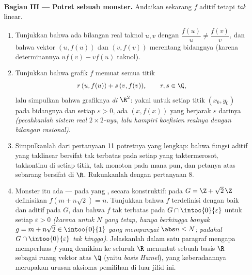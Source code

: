 \begin{problem}[{Soal akhir pekan --- $f(x + y) = f(x) + f(y)$:
keteraturan memaksa kelinearan, beserta potret monsternya}]
\medskip
\noindent\textbf{Bagian III --- Potret sebuah monster.} Andaikan
sekarang $f$ aditif tetapi \emph{tak} linear.
\begin{enumerate}[resume]
  \item Tunjukkan bahwa ada bilangan real taknol $u, v$ dengan
        $\dfrac{f(u)}{u} \neq \dfrac{f(v)}{v}$, dan bahwa
        vektor $(u, f(u))$ dan $(v, f(v))$ merentang bidangnya (karena
        determinannya $u f(v) - v f(u)$ taknol).
  \item Tunjukkan bahwa grafik $f$ memuat semua titik
        \[
        r\,(u, f(u)) + s\,(v, f(v)), \qquad r, s \in \Q ,
        \]
        lalu simpulkan bahwa grafiknya \emph{ di $\R^2$}: yakni untuk
        setiap titik $(x_0, y_0)$ pada bidangnya dan setiap
        $\varepsilon > 0$, ada $(x, f(x))$ yang berjarak
        $\varepsilon$ darinya \emph{(pecahkanlah sistem real $2\times2$-nya,
        lalu hampiri koefisien realnya dengan
        bilangan rasional)}.
  \item Simpulkanlah dari pertanyaan 11 potretnya yang lengkap: bahwa fungsi
        aditif yang taklinear bersifat tak terbatas pada setiap 
        yang taktermerosot, takkontinu di setiap titik, tak monoton pada
         mana pun, dan petanya atas sebarang  bersifat  di
        $\R$. Rukunkanlah dengan pertanyaan 8.
  \item Monster itu ada --- pada  yang , secara konstruktif:
        pada $G = \Z + \sqrt2\,\Z$ definisikan $f(m + n\sqrt2) = n$.
        Tunjukkan bahwa $f$ terdefinisi dengan baik dan aditif pada $G$, dan bahwa
        $f$ tak terbatas pada $G \cap \intoo{0}{\varepsilon}$ untuk
        setiap $\varepsilon > 0$ \emph{(karena untuk $N$ yang tetap, hanya
        berhingga banyak $g = m + n\sqrt2 \in \intoo{0}{1}$ yang mempunyai
        $\abs n \leq N$; padahal $G \cap \intoo{0}{\varepsilon}$
        tak hingga)}. Jelaskanlah dalam satu paragraf mengapa memperluas
        $f$ yang demikian ke seluruh $\R$ menuntut sebuah basis $\R$ sebagai
        ruang vektor atas $\Q$ (yaitu \emph{basis Hamel}), yang
        keberadaannya merupakan urusan aksioma pemilihan di luar
        jilid ini.
\end{enumerate}


\end{problem}
